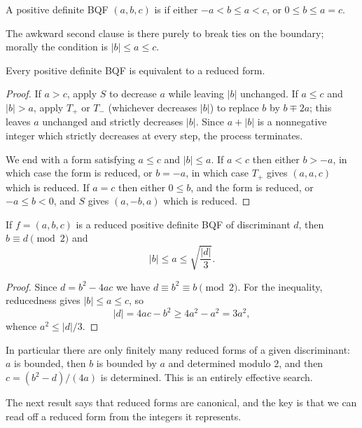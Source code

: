 \documentclass[a4paper]{scrartcl}
\begin{document}
\begin{definition}
	A positive definite BQF $(a,b,c)$ is  if either $-a < b \leq a < c$, or $0 \leq b \leq a = c$.
\end{definition}

The awkward second clause is there purely to break ties on the boundary; morally the condition is $|b| \leq a \leq c$.

\begin{proposition}
	Every positive definite BQF is equivalent to a reduced form.
\end{proposition}
\begin{proof}
	If $a > c$, apply $S$ to decrease $a$ while leaving $|b|$ unchanged. If $a \leq c$ and $|b| > a$, apply $T_+$ or $T_-$ (whichever decreases $|b|$) to replace $b$ by $b \mp 2a$; this leaves $a$ unchanged and strictly decreases $|b|$. Since $a + |b|$ is a nonnegative integer which strictly decreases at every step, the process terminates.

	We end with a form satisfying $a \leq c$ and $|b| \leq a$. If $a < c$ then either $b > -a$, in which case the form is reduced, or $b = -a$, in which case $T_+$ gives $(a, a, c)$ which is reduced. If $a = c$ then either $0 \leq b$, and the form is reduced, or $-a \leq b < 0$, and $S$ gives $(a, -b, a)$ which is reduced.
\end{proof}

\begin{lemma}\label{lem:redbound}
	If $f = (a,b,c)$ is a reduced positive definite BQF of discriminant $d$, then $b \equiv d \pmod 2$ and
	$$
	|b| \leq a \leq \sqrt{\frac{|d|}3}.
	$$
\end{lemma}
\begin{proof}
	Since $d = b^2 - 4ac$ we have $d \equiv b^2 \equiv b \pmod 2$. For the inequality, reducedness gives $|b| \leq a \leq c$, so
	$$
	|d| = 4ac - b^2 \geq 4a^2 - a^2 = 3a^2,
	$$
	whence $a^2 \leq |d|/3$.
\end{proof}

In particular there are only finitely many reduced forms of a given discriminant: $a$ is bounded, then $b$ is bounded by $a$ and determined modulo $2$, and then $c = (b^2 - d)/(4a)$ is determined. This is an entirely effective search.

The next result says that reduced forms are canonical, and the key is that we can read off a reduced form from the integers it represents.
\end{document}
